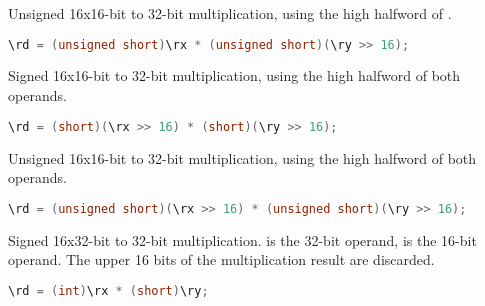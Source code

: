 Unsigned 16x16-bit to 32-bit multiplication, using the high halfword of
\code{\ry}.

\begin{lstlisting}[numbers=none, basicstyle=\ttfamily\footnotesize, language=C++]
\rd = (unsigned short)\rx * (unsigned short)(\ry >> 16);
\end{lstlisting}

Signed 16x16-bit to 32-bit multiplication, using the high halfword of both
operands.

\begin{lstlisting}[numbers=none, basicstyle=\ttfamily\footnotesize, language=C++]
\rd = (short)(\rx >> 16) * (short)(\ry >> 16);
\end{lstlisting}

Unsigned 16x16-bit to 32-bit multiplication, using the high halfword of both
operands.

\begin{lstlisting}[numbers=none, basicstyle=\ttfamily\footnotesize, language=C++]
\rd = (unsigned short)(\rx >> 16) * (unsigned short)(\ry >> 16);
\end{lstlisting}

Signed 16x32-bit to 32-bit multiplication. \code{\rx} is the 32-bit operand,
\code{\ry} is the 16-bit operand. The upper 16 bits of the multiplication result
are discarded.

\begin{lstlisting}[numbers=none, basicstyle=\ttfamily\footnotesize, language=C++]
\rd = (int)\rx * (short)\ry;
\end{lstlisting}

